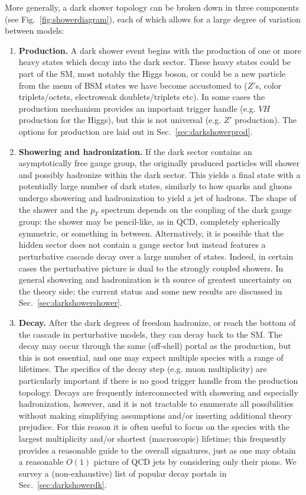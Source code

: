 More generally, a dark shower topology can be broken down in three components (see Fig.~\ref{fig:showerdiagram}), each of which allows for a large degree of variation between models:
\begin{enumerate}
\item \textbf{Production.} A dark shower event begins with the production of one or more heavy states which decay into the dark sector. These heavy states could be part of the SM, most notably the Higgs boson, or could be a new particle from the menu of BSM states we have become accustomed to ($Z'$s, color triplets/octets, electroweak doublets/triplets etc). In some cases the production mechanism provides an important trigger handle (e.g. $VH$  production for the Higgs), but this is not universal (e.g. $Z'$ production). The options for production are laid out in Sec.~\ref{sec:darkshowerprod}.

\item \textbf{Showering and hadronization.} If the dark sector contains an asymptotically free gauge group, the originally produced particles will shower and possibly hadronize within the dark sector. This yields a final state with a potentially large number of dark states, similarly to how quarks and gluons undergo showering and hadronization to yield a jet of hadrons. The shape of the shower and the $p_T$ spectrum depends on the coupling of the dark gauge group: the shower may be pencil-like, as in QCD, completely spherically symmetric, or something in between. Alternatively, it is possible that the hidden sector does not contain a gauge sector but instead features a perturbative cascade decay over a large number of states. Indeed, in certain cases the perturbative picture is dual to the strongly coupled showers. In general showering and hadronization is th source of greatest uncertainty on the theory side; the current status and some new results are discussed in Sec.~\ref{sec:darkshowershower}.

\item \textbf{Decay.} After the dark degrees of freedom hadronize, or reach the bottom of the cascade in perturbative models, they can decay back to the SM. The decay may occur through the same (off-shell) portal as the production, but this is not essential, and one may expect multiple species with a range of lifetimes. The specifics of the decay step (e.g. muon multiplicity) are particularly important if there is no good trigger handle from the production topology. Decays are frequently interconnected with showering and especially hadronization, however, and it is not tractable to enumerate all possibilities without making simplifying assumptions and/or inserting additional theory prejudice. For this reason it is often useful to focus on the species with the largest multiplicity and/or shortest (macroscopic) lifetime; this frequently provides a reasonable guide to the overall signatures, just as one may obtain a reasonable $O(1)$ picture of QCD jets by considering only their pions. We survey a (non-exhaustive) list of popular decay portals in Sec.~\ref{sec:darkshowerdk}.


\end{enumerate}

